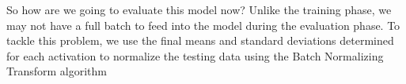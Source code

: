 {{%
So how are we going to evaluate this model now? Unlike the training phase, we may not have a full batch to feed into the model during the evaluation phase. To tackle this problem, we use the final means and standard deviations determined for each activation to normalize the testing data using the Batch Normalizing Transform algorithm \cite{johann_huber_2020}
}
}


